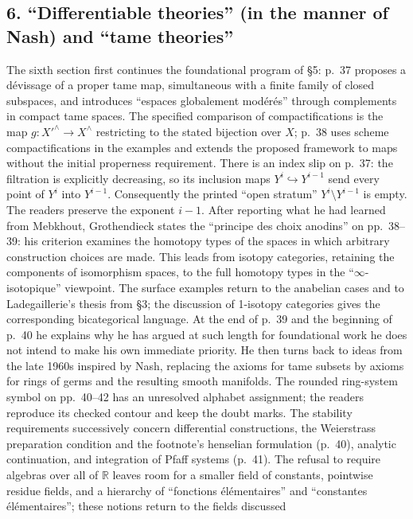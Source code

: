 \documentclass[11pt,a4paper]{article}
\begin{document}
\subsection*{6. ``Differentiable theories'' (in the manner of Nash) and ``tame theories''}
The sixth section first continues the foundational program of \S5:
p.~37 proposes a dévissage of a proper tame map, simultaneous with a
finite family of closed subspaces, and introduces ``espaces globalement
modérés'' through complements in compact tame spaces. The specified
comparison of compactifications is the map
$g:X'^{\wedge}\longrightarrow X^{\wedge}$ restricting to the stated
bijection over $X$; p.~38 uses scheme compactifications in the examples
and extends the proposed framework to maps without the initial properness
requirement. There is an index slip on p.~37: the filtration is explicitly
decreasing, so its inclusion maps
$Y^i\hookrightarrow Y^{i-1}$ send every point of $Y^i$ into
$Y^{i-1}$. Consequently the printed ``open stratum''
$Y^i\setminus Y^{i-1}$ is empty. The readers preserve the exponent
$i-1$. After reporting what he had learned from Mebkhout, Grothendieck
states the ``principe des choix anodins'' on pp.~38--39: his criterion
examines the homotopy types of the spaces in which arbitrary construction
choices are made. This leads from isotopy categories, retaining the
components of isomorphism spaces, to the full homotopy types in the
``$\infty$-isotopique'' viewpoint. The surface examples return to the
anabelian cases and to Ladegaillerie's thesis from \S3; the discussion of
1-isotopy categories gives the corresponding bicategorical language.
At the end of p.~39 and the beginning of p.~40 he explains why he has
argued at such length for foundational work he does not intend to make
his own immediate priority. He then turns back to ideas from the late
1960s inspired by Nash, replacing the axioms for tame subsets by axioms
for rings of germs and the resulting smooth manifolds. The rounded
ring-system symbol on pp.~40--42 has an unresolved alphabet assignment;
the readers reproduce its checked contour and keep the doubt marks.
The stability requirements successively concern differential constructions,
the Weierstrass preparation condition and the footnote's henselian
formulation (p.~40), analytic continuation, and integration of Pfaff
systems (p.~41). The refusal to require algebras over all of
$\mathbb R$ leaves room for a smaller field of constants, pointwise
residue fields, and a hierarchy of ``fonctions élémentaires'' and
``constantes élémentaires''; these notions return to the fields discussed
\end{document}
